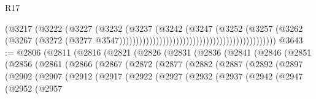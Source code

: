 \begin{lexlean}{R17}
\begin{coremodule}
                                                                        (@3217
                                                                          (@3222
                                                                            (@3227
                                                                              (@3232
                                                                                (@3237
                                                                                  (@3242
                                                                                    (@3247
                                                                                      (@3252
                                                                                        (@3257
                                                                                          (@3262
                                                                                            (@3267
                                                                                              (@3272
                                                                                                (@3277
                                                                                                  @3547)))))))))))))))))))))))))))))))))))))))))))))))
@3643 := @2806
    (@2811
      (@2816
        (@2821
          (@2826
            (@2831
              (@2836
                (@2841
                  (@2846
                    (@2851
                      (@2856
                        (@2861
                          (@2866
                            (@2867
                              (@2872
                                (@2877
                                  (@2882
                                    (@2887
                                      (@2892
                                        (@2897
                                          (@2902
                                            (@2907
                                              (@2912
                                                (@2917
                                                  (@2922
                                                    (@2927
                                                      (@2932
                                                        (@2937
                                                          (@2942
                                                            (@2947
                                                              (@2952
                                                                (@2957

\end{coremodule}
\end{lexlean}

